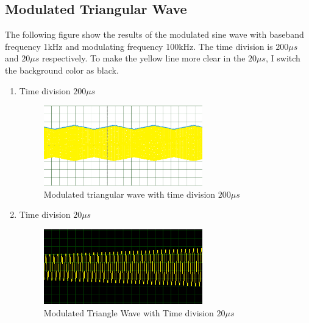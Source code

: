 \documentclass [utf8] {article}
\begin{document}
{\begin{enumerate}
	\end{enumerate}

	\subsection{Modulated Triangular Wave}
	{
		The following figure show the results of the modulated sine wave with baseband frequency 1kHz and modulating frequency 100kHz. The time division is $200\mu s$ and $20\mu s$ respectively. To make the yellow line more clear in the $20\mu s$, I switch the background color as black.
		\begin{enumerate}
			\item Time division $200\mu s$
			\begin{figure}[H]
				\begin{small}
					\begin{center}
						\includegraphics[width=0.65\textwidth]{figures/Figure17.png}
					\end{center}
					\caption{Modulated triangular wave with time division $200\mu s$}
					\label{fig:fig-2-1}
				\end{small}
			\end{figure}

			\item Time division $20\mu s$
			\begin{figure}[H]
				\begin{small}
					\begin{center}
						\includegraphics[width=0.65\textwidth]{figures/Figure18.png}
					\end{center}
					\caption{Modulated Triangle Wave with Time division $20\mu s$}
					\label{fig:fig-2-2}
				\end{small}
			\end{figure}
		\end{enumerate}
	}
	
}
\end{document}
